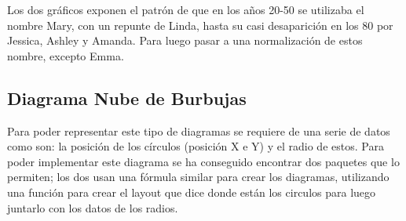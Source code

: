 \documentclass{article}\usepackage[]{graphicx}\usepackage[]{color}
\begin{document}
Los dos gr\'aficos exponen el patr\'on de que en los a\~nos 20-50 se utilizaba el nombre Mary, con un repunte de Linda, hasta su casi desaparici\'on en los 80 por Jessica, Ashley y Amanda. Para luego pasar a una normalizaci\'on de estos nombre, excepto Emma.
\clearpage
\subsection{Diagrama Nube de Burbujas}\label{ssec:burbujas}
Para poder representar este tipo de diagramas se requiere de una serie de datos como son: la posici\'on de los c\'irculos (posici\'on X e Y) y el radio de estos. Para poder implementar este diagrama se ha conseguido encontrar dos paquetes que lo permiten; los dos usan una f\'ormula similar para crear los diagramas, utilizando una funci\'on para crear el layout que dice donde est\'an los circulos para luego juntarlo con los datos de los radios.
\end{document}
